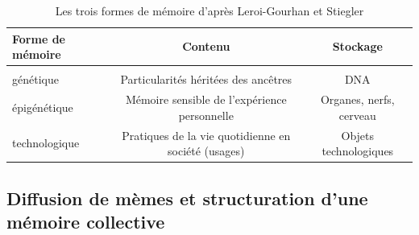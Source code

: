 \begin{table}[htbp]
    \begin{tabulary}{\textwidth}{L|C C}
        \centering
        \textbf{Forme de mémoire} &  \textbf{Contenu}  & \textbf{Stockage} \\[3ex]
        \hline \\ [-1.5ex]
        génétique  &  Particularités héritées des ancêtres   &  DNA \\[3ex]
        
        épigénétique   &  Mémoire sensible de l’expérience personnelle   &  Organes, nerfs, cerveau \\[3ex]
        
        technologique  &  Pratiques de la vie quotidienne en société (usages) & Objets technologiques \\[3ex]
    \end{tabulary}
    \caption{Les trois formes de mémoire d{\textquoteright}après Leroi-Gourhan et Stiegler}
\end{table}


\subsection[Diffusion de mèmes et structuration d{\textquoteright}une mémoire collective]{Diffusion de mèmes et structuration d{\textquoteright}une mémoire collective}

